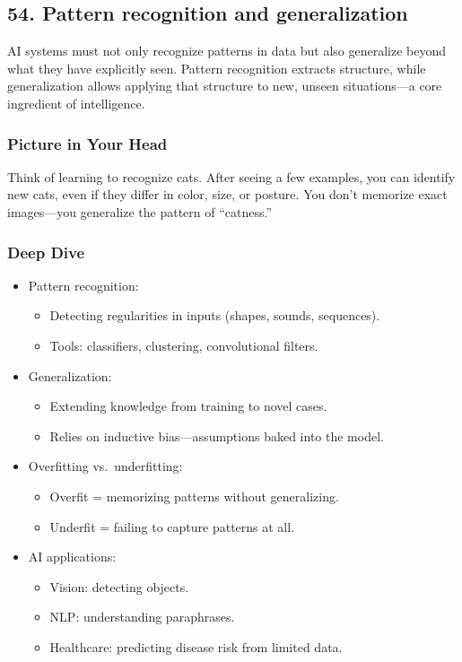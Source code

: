 \documentclass[
  letterpaper,
  DIV=11,
  numbers=noendperiod]{scrreprt}
\providecommand{\tightlist}{%
  \setlength{\itemsep}{0pt}\setlength{\parskip}{0pt}}
\begin{document}
\subsection{54. Pattern recognition and
generalization}\label{pattern-recognition-and-generalization}

AI systems must not only recognize patterns in data but also generalize
beyond what they have explicitly seen. Pattern recognition extracts
structure, while generalization allows applying that structure to new,
unseen situations---a core ingredient of intelligence.

\subsubsection{Picture in Your Head}\label{picture-in-your-head-53}

Think of learning to recognize cats. After seeing a few examples, you
can identify new cats, even if they differ in color, size, or posture.
You don't memorize exact images---you generalize the pattern of
``catness.''

\subsubsection{Deep Dive}\label{deep-dive-53}

\begin{itemize}
\item
  Pattern recognition:

  \begin{itemize}
  \tightlist
  \item
    Detecting regularities in inputs (shapes, sounds, sequences).
  \item
    Tools: classifiers, clustering, convolutional filters.
  \end{itemize}
\item
  Generalization:

  \begin{itemize}
  \tightlist
  \item
    Extending knowledge from training to novel cases.
  \item
    Relies on inductive bias---assumptions baked into the model.
  \end{itemize}
\item
  Overfitting vs.~underfitting:

  \begin{itemize}
  \tightlist
  \item
    Overfit = memorizing patterns without generalizing.
  \item
    Underfit = failing to capture patterns at all.
  \end{itemize}
\item
  AI applications:

  \begin{itemize}
  \tightlist
  \item
    Vision: detecting objects.
  \item
    NLP: understanding paraphrases.
  \item
    Healthcare: predicting disease risk from limited data.
  \end{itemize}
\end{itemize}
\end{document}
